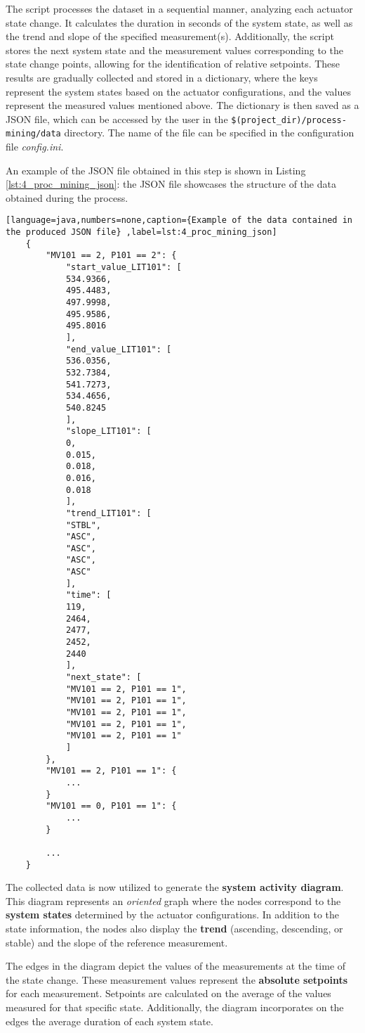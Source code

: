 The script processes the dataset in a sequential manner, analyzing each actuator state change. It calculates the duration in seconds of the system state, as well as the trend and slope of the specified measurement(s). Additionally, the script stores the next system state and the measurement values corresponding to the state change points, allowing for the identification of relative setpoints. These results are gradually collected and stored in a dictionary, where the keys represent the system states based on the actuator configurations, and the values represent the measured values mentioned above. The dictionary is then saved as a JSON file, which can be accessed by the user in the \texttt{\$(project\_dir)/process-mining/data} directory. The name of the file can be specified in the configuration file \textit{config.ini}.

\bigskip
An example of the JSON file obtained in this step is shown in Listing \ref{lst:4_proc_mining_json}: the JSON file showcases the structure of the data obtained during the process.

\begin{lstlisting}[language=java,numbers=none,caption={Example of the data contained in the produced JSON file} ,label=lst:4_proc_mining_json]
	{
		"MV101 == 2, P101 == 2": {
			"start_value_LIT101": [
			534.9366,
			495.4483,
			497.9998,
			495.9586,
			495.8016
			],
			"end_value_LIT101": [
			536.0356,
			532.7384,
			541.7273,
			534.4656,
			540.8245
			],
			"slope_LIT101": [
			0,
			0.015,
			0.018,
			0.016,
			0.018
			],
			"trend_LIT101": [
			"STBL",
			"ASC",
			"ASC",
			"ASC",
			"ASC"
			],
			"time": [
			119,
			2464,
			2477,
			2452,
			2440
			],
			"next_state": [
			"MV101 == 2, P101 == 1",
			"MV101 == 2, P101 == 1",
			"MV101 == 2, P101 == 1",
			"MV101 == 2, P101 == 1",
			"MV101 == 2, P101 == 1"
			]
		},
		"MV101 == 2, P101 == 1": {
			...
		}
		"MV101 == 0, P101 == 1": {
			...
		}
		
		...
	}
\end{lstlisting}

The collected data is now utilized to generate the \textbf{system activity diagram}. This diagram represents an \textit{oriented} graph where the nodes correspond to the \textbf{system states} determined by the actuator configurations. In addition to the state information, the nodes also display the \textbf{trend} (ascending, descending, or stable) and the slope of the reference measurement.

The edges in the diagram depict the values of the measurements at the time of the state change. These measurement values represent the \textbf{absolute setpoints} for each measurement. Setpoints are calculated on the average of the values measured for that specific state. Additionally, the diagram incorporates on the edges the average duration of each system state.

